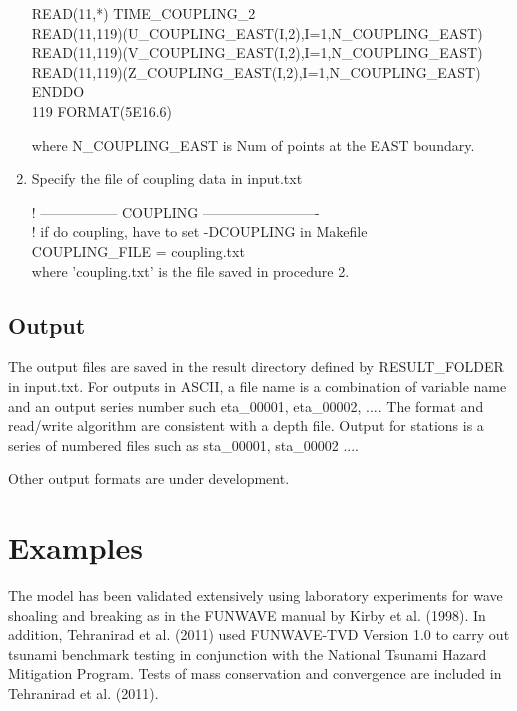 \documentclass[11pt]{article}
\begin{document}
\begin{enumerate}
             READ(11,*) TIME\_COUPLING\_2 \\
             READ(11,119)(U\_COUPLING\_EAST(I,2),I=1,N\_COUPLING\_EAST)\\
             READ(11,119)(V\_COUPLING\_EAST(I,2),I=1,N\_COUPLING\_EAST)\\
             READ(11,119)(Z\_COUPLING\_EAST(I,2),I=1,N\_COUPLING\_EAST)\\
           ENDDO \\          
119      FORMAT(5E16.6) 
           
where N\_COUPLING\_EAST is Num of points at the EAST boundary.
       
 
\item Specify the file of coupling data in input.txt

  ! ----------------- COUPLING -------------------------\\
  ! if do coupling, have to set -DCOUPLING in Makefile \\
COUPLING\_FILE = coupling.txt \\
where 'coupling.txt' is the file saved in procedure 2. 

\end{enumerate}
 

\subsection{Output}
The output files are saved in the result directory defined by RESULT\_FOLDER in input.txt. For outputs in ASCII,  a file name is a combination of variable name and an output series number such eta\_00001, eta\_00002, .... The format  and read/write algorithm are  consistent with a depth file.  Output for stations is a series of numbered files such as sta\_00001, sta\_00002 .... 

Other output formats are under development. 

\section{Examples}

The model has been validated extensively using laboratory experiments for wave shoaling and breaking as in the FUNWAVE manual by Kirby et al. (1998). In addition, Tehranirad et al. (2011) used FUNWAVE-TVD Version 1.0 to carry out tsunami benchmark testing in conjunction with the National Tsunami Hazard Mitigation Program. Tests of mass conservation and convergence are included in Tehranirad et al. (2011). 
\end{document}
